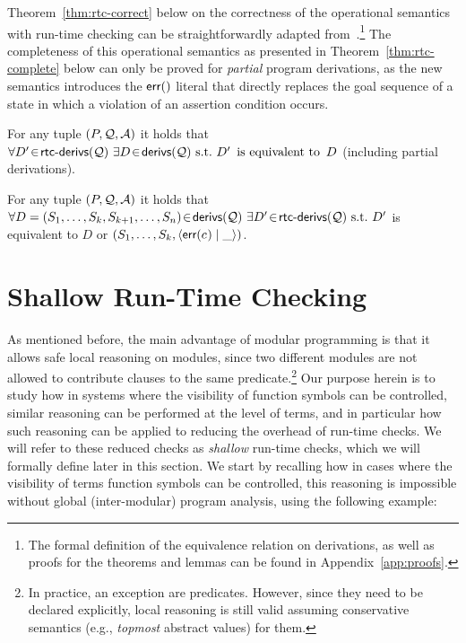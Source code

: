 \documentclass{llncs}
\begin{document}
Theorem~\ref{thm:rtc-correct} below on the correctness of the
operational semantics with run-time checking can be straightforwardly
adapted from~\cite{asrHO-ppdp2014-shorter}.\footnote{The formal
  definition of the equivalence relation on derivations, as well as
  proofs for the theorems and lemmas can be found in
  Appendix~\ref{app:proofs}.}
%
The completeness of this operational semantics as presented in
Theorem~\ref{thm:rtc-complete} below can only be proved for
\emph{partial} program derivations, as the new semantics introduces
the $\textsf{err}()$ literal that directly replaces the goal sequence of a
state in which a violation of an assertion condition
occurs.

\begin{theorem}
  \label{thm:rtc-correct}
  For any tuple $(P,{\cal Q},{\cal A})$
  it holds that
  $ \forall D'\!\in\!\textsf{rtc-derivs}({\cal Q})~\exists D\!\in\!\textsf{derivs}({\cal Q})
  \text{~s.t.~} D'\, \text{~is equivalent to~} \,D$
  (including partial derivations).
\end{theorem}

\begin{theorem}
  \label{thm:rtc-complete}
  For any tuple $(P,{\cal Q},{\cal A})$
  it holds that
   $ \forall D = (S_1,\ldots,S_k,S_{k+1},\ldots,S_n)\!\in\!\textsf{derivs}({\cal Q})
    ~\exists D'\!\in\!\textsf{rtc-derivs}({\cal Q})
   \text{~s.t.~} D'$ is equivalent to $D$ or $(S_1,\ldots,S_k,\langle \textsf{err}(c_{}) \mid{} \_ \rangle)$.
\end{theorem}



\section{Shallow Run-Time Checking}
\label{sec:hiding}

As mentioned before, the main advantage of modular programming is that
it allows safe local reasoning on modules, since two different modules
are not allowed to contribute clauses to the same
predicate.\footnote{In practice, an exception
  are
   predicates. However, since
  they need to
  be declared explicitly, local reasoning is still valid assuming
  conservative semantics (e.g., \emph{topmost} abstract values) for
  them.}
%
Our purpose herein is to study how in systems where the visibility of
function symbols can be controlled, similar reasoning can be performed
at the level of terms, and in particular how such reasoning can be
applied to reducing the overhead of run-time checks. %
%
We will refer to these reduced checks as \emph{shallow} run-time
checks, which we will formally define later in this section.
%
We start by recalling how in cases where the visibility of terms
function symbols can be controlled, this reasoning is impossible without
global (inter-modular) program analysis,
using the following example:
\end{document}
